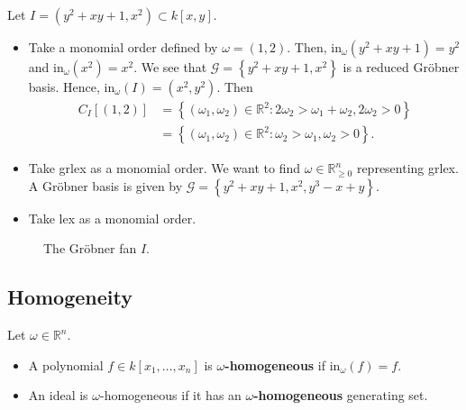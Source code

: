 \documentclass[a4paper, 11pt]{article}
\begin{document}
\begin{eg}
  Let \( I = ( y^2 + xy + 1, x^2) \subset k[x,y] \).

  \begin{itemize}
    \item Take a monomial order defined by \( \omega = (1,2) \). Then, \( \mathrm{in}_\omega(y^2 + xy + 1) = y^2 \) and \( \mathrm{in}_\omega(x^2) = x^2 \). We see that \( \mathcal{G} = \left\{ y^2 + xy + 1, x^2 \right\} \) is a reduced Gröbner basis. Hence, \( \mathrm{in}_\omega(I) = (x^2, y^2) \). Then 
    \begin{align*}
      C_I[(1,2)] &= \left\{ (\omega_1, 
      \omega_2) \in \mathbb R^2 : 2\omega_2 > \omega_1 + \omega_2, 2\omega_2 > 0 \right\} \\ &= \left\{ (\omega_1, 
      \omega_2) \in \mathbb R^2 : \omega_2 > \omega_1 , \omega_2 > 0 \right\}.
    \end{align*}

    \item Take grlex as a monomial order. We want to find \( \omega \in \mathbb R^n_{\geq 0} \) representing grlex. A Gröbner basis is given by \( \mathcal{G} = \left\{ y^2 + xy + 1, x^2, y^3 - x + y \right\} \).

    \item Take lex as a monomial order.
  \end{itemize}

  \begin{figure}[H]
    \centering
      \caption{The Gröbner fan \( I \).}
  \end{figure}
\end{eg}

\subsection{Homogeneity}

\begin{defi}
  Let \( \omega \in \mathbb R^n \). 
  \begin{itemize}
    \item   A polynomial \( f \in k[ x_1, \dots, x_n] \) is \textbf{\( \omega \)-homogeneous} if \( \mathrm{in}_\omega(f) = f \). 

    \item An ideal is \( \omega \)-homogeneous if it has an \textbf{\( \omega \)-homogeneous} generating set.
  \end{itemize}
  
\end{defi}
\end{document}
